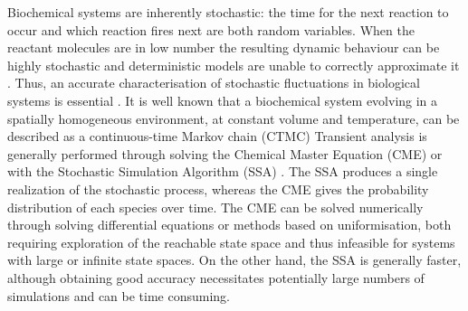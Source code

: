 \documentclass{llncs}
\begin{document}
Biochemical systems are inherently stochastic: the time for the next reaction to occur and which reaction fires next  are both random variables. When the reactant molecules are in low number the resulting dynamic behaviour can be highly stochastic and deterministic models are unable to correctly approximate it  \cite{mcadams1997stochastic,arkin1998stochastic}. 
Thus, an accurate characterisation of stochastic fluctuations in 
biological systems is essential \cite{Kampen1992b}.
It is well known that a biochemical system evolving in a spatially homogeneous environment, at constant volume and temperature, can be described as a continuous-time Markov chain (CTMC) \cite{ethier2009markov} %
Transient analysis is generally performed through solving the Chemical Master Equation (CME) \cite{Kampen1992b} or with the Stochastic Simulation Algorithm (SSA) \cite{gillespie1977exact}. The SSA produces a single realization of the stochastic process, whereas the CME gives the probability distribution of each species over time.
The CME can be solved numerically through solving differential equations or methods based on uniformisation, both requiring exploration of
the reachable state space and thus infeasible for systems with large or infinite state spaces.
On the other hand, the SSA is generally faster, although obtaining good accuracy necessitates potentially large numbers of simulations and can be time consuming.
\end{document}
